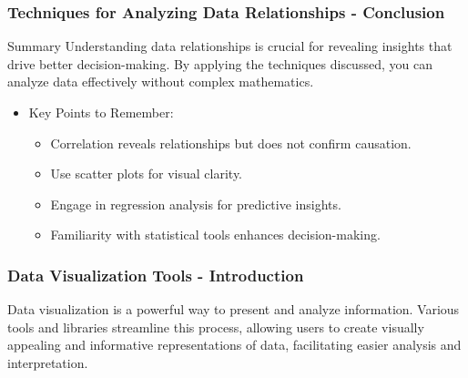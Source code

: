 \documentclass[aspectratio=169]{beamer}
\begin{document}
\begin{frame}[fragile]
    \frametitle{Techniques for Analyzing Data Relationships - Conclusion}
    \begin{block}{Summary}
        Understanding data relationships is crucial for revealing insights that drive better decision-making. By applying the techniques discussed, you can analyze data effectively without complex mathematics. 
    \end{block}
    
    \begin{itemize}
        \item Key Points to Remember:
            \begin{itemize}
                \item Correlation reveals relationships but does not confirm causation.
                \item Use scatter plots for visual clarity.
                \item Engage in regression analysis for predictive insights.
                \item Familiarity with statistical tools enhances decision-making.
            \end{itemize}
    \end{itemize}
\end{frame}

\begin{frame}[fragile]
    \frametitle{Data Visualization Tools - Introduction}
    Data visualization is a powerful way to present and analyze information. Various tools and libraries streamline this process, allowing users to create visually appealing and informative representations of data, facilitating easier analysis and interpretation.
\end{frame}
\end{document}
